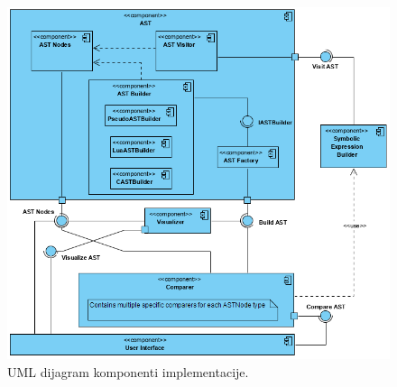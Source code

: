 \begin{figure}[h!]
\centering
\includegraphics[scale=0.8]{images/uml/ComponentDiagram.png}
\caption{UML dijagram komponenti implementacije.}
\label{fig:ImplementationComponents}
\end{figure}






